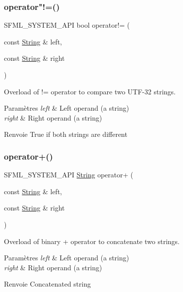 \subsubsection{\texorpdfstring{operator"!=()}{operator!=()}}
{\footnotesize\ttfamily S\+F\+M\+L\+\_\+\+S\+Y\+S\+T\+E\+M\+\_\+\+A\+PI bool operator!= (\begin{DoxyParamCaption}\item[{const \hyperlink{classsf_1_1String}{String} \&}]{left,  }\item[{const \hyperlink{classsf_1_1String}{String} \&}]{right }\end{DoxyParamCaption})\hspace{0.3cm}{\ttfamily [related]}}



Overload of != operator to compare two U\+T\+F-\/32 strings. 


\begin{DoxyParams}{Paramètres}
{\em left} & Left operand (a string) \\
\hline
{\em right} & Right operand (a string)\\
\hline
\end{DoxyParams}
\begin{DoxyReturn}{Renvoie}
True if both strings are different 
\end{DoxyReturn}
\mbox{\label{classsf_1_1String_a55ef2bf7dc6b295ef7127b0bc1e58760}} 
\subsubsection{\texorpdfstring{operator+()}{operator+()}}
{\footnotesize\ttfamily S\+F\+M\+L\+\_\+\+S\+Y\+S\+T\+E\+M\+\_\+\+A\+PI \hyperlink{classsf_1_1String}{String} operator+ (\begin{DoxyParamCaption}\item[{const \hyperlink{classsf_1_1String}{String} \&}]{left,  }\item[{const \hyperlink{classsf_1_1String}{String} \&}]{right }\end{DoxyParamCaption})\hspace{0.3cm}{\ttfamily [related]}}



Overload of binary + operator to concatenate two strings. 


\begin{DoxyParams}{Paramètres}
{\em left} & Left operand (a string) \\
\hline
{\em right} & Right operand (a string)\\
\hline
\end{DoxyParams}
\begin{DoxyReturn}{Renvoie}
Concatenated string 
\end{DoxyReturn}
\mbox{\label{classsf_1_1String_ac2ca5a7703402a2bbafd85eec6d1e846}} 
